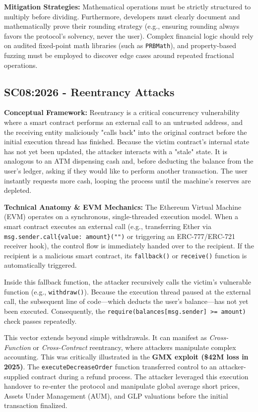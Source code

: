 \textbf{Mitigation Strategies:} Mathematical operations must be strictly structured to multiply before dividing. Furthermore, developers must clearly document and mathematically prove their rounding strategy (e.g., ensuring rounding always favors the protocol's solvency, never the user). Complex financial logic should rely on audited fixed-point math libraries (such as \texttt{PRBMath}), and property-based fuzzing must be employed to discover edge cases around repeated fractional operations.

\subsection{SC08:2026 - Reentrancy Attacks}
\textbf{Conceptual Framework:} Reentrancy is a critical concurrency vulnerability where a smart contract performs an external call to an untrusted address, and the receiving entity maliciously "calls back" into the original contract before the initial execution thread has finished. Because the victim contract's internal state has not yet been updated, the attacker interacts with a "stale" state. It is analogous to an ATM dispensing cash and, before deducting the balance from the user's ledger, asking if they would like to perform another transaction. The user instantly requests more cash, looping the process until the machine's reserves are depleted.

\textbf{Technical Anatomy \& EVM Mechanics:} The Ethereum Virtual Machine (EVM) operates on a synchronous, single-threaded execution model. When a smart contract executes an external call (e.g., transferring Ether via \texttt{msg.sender.call\{value: amount\}("")} or triggering an ERC-777/ERC-721 receiver hook), the control flow is immediately handed over to the recipient. If the recipient is a malicious smart contract, its \texttt{fallback()} or \texttt{receive()} function is automatically triggered. 

Inside this fallback function, the attacker recursively calls the victim's vulnerable function (e.g., \texttt{withdraw()}). Because the execution thread paused at the external call, the subsequent line of code—which deducts the user's balance—has not yet been executed. Consequently, the \texttt{require(balances[msg.sender] >= amount)} check passes repeatedly. 

This vector extends beyond simple withdrawals. It can manifest as \textit{Cross-Function} or \textit{Cross-Contract} reentrancy, where attackers manipulate complex accounting. This was critically illustrated in the \textbf{GMX exploit (\$42M loss in 2025)}. The \texttt{executeDecreaseOrder} function transferred control to an attacker-supplied contract during a refund process. The attacker leveraged this execution handover to re-enter the protocol and manipulate global average short prices, Assets Under Management (AUM), and GLP valuations before the initial transaction finalized.

